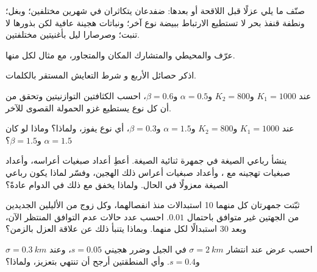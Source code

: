 \begin{exercise}[$\star$]\label{exo:b2:speciation:2}
صنّف ما يلي عزلًا قبل اللاقحة أو بعدها: ضفدعان يتكاثران في
شهرين مختلفين؛ وبغل؛ ونطفة قنفذ بحر لا تستطيع الارتباط
ببيضة نوع آخر؛ ونباتات هجينة عافية لكن
بذورها لا تنبت؛ وصرصارا ليل بأغنيتين مختلفتين.
\end{exercise}

\begin{exercise}[$\star$]\label{exo:b2:speciation:3}
عرّف  والمحيطي والمتشارك المكان
والمتجاور، مع مثال لكل منها.
\end{exercise}

\begin{exercise}[$\star$]\label{exo:b2:speciation:4}
اذكر حصائل  الأربع و
شرط التعايش المستقر بالكلمات.
\end{exercise}

\begin{exercise}[$\star\star$]\label{exo:b2:speciation:5}
عند $K_1 = 1000$ و$K_2 = 800$ و$\alpha = 0.5$ و$\beta = 0.6$،
احسب الكثافتين التوازنيتين وتحقق من أن كل نوع يستطيع
غزو الحمولة القصوى للآخر.
\end{exercise}

\begin{exercise}[$\star\star$]\label{exo:b2:speciation:6}
عند $K_1 = 1000$ و$K_2 = 800$ و$\alpha = 1.5$ و$\beta = 0.3$، أي
نوع يفوز، ولماذا؟ وماذا لو كان $\alpha = 1.5$ و$\beta = 1.5$؟
\end{exercise}

\begin{exercise}[$\star\star$]\label{exo:b2:speciation:7}
ينشأ رباعي الصيغة في جمهرة ثنائية الصيغة. أعطِ أعداد
صبغيات أعراسه، وأعداد صبغيات تهجينه مع ، وأعداد صبغيات أعراس ذلك
الهجين، وفسّر لماذا يكون رباعي الصيغة معزولًا في
الحال. ولماذا يخفق مع ذلك في الدوام عادةً؟
\end{exercise}

\begin{exercise}[$\star\star$]\label{exo:b2:speciation:8}
ثبّتت جمهرتان كل منهما 10 استبدالات منذ انفصالهما،
وكل زوج من الأليلين الجديدين من الجهتين غير متوافق
باحتمال $0.01$. احسب عدد حالات عدم التوافق المنتظر
الآن، وبعد 30 استبدالًا لكل منهما. وبماذا
يتنبأ ذلك عن علاقة العزل بالزمن؟
\end{exercise}

\begin{exercise}[$\star\star$]\label{exo:b2:speciation:9}
احسب عرض  عند انتشار $\sigma =
\qty{2}{km}$ في الجيل وضرر هجيني $s = 0.05$، وعند
$\sigma = \qty{0.3}{km}$ و$s = 0.4$. وأي المنطقتين أرجح
أن تنتهي بتعزيز، ولماذا؟
\end{exercise}

